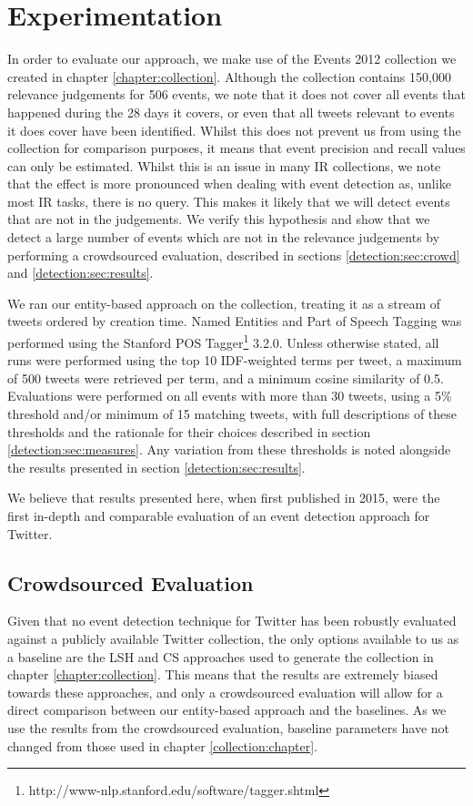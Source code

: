 
\section{Experimentation}
\label{detection:sec:experimentation}
In order to evaluate our approach, we make use of the Events 2012 collection we created in chapter \ref{chapter:collection}.
Although the collection contains 150,000 relevance judgements for 506 events, we note that it does not cover all events that happened during the 28 days it covers, or even that all tweets relevant to events it does cover have been identified.
Whilst this does not prevent us from using the collection for comparison purposes, it means that event precision and recall values can only be estimated.
Whilst this is an issue in many IR collections, we note that the effect is more pronounced when dealing with event detection as, unlike most IR tasks, there is no query.
This makes it likely that we will detect events that are not in the judgements.
We verify this hypothesis and show that we detect a large number of events which are not in the relevance judgements by performing a crowdsourced evaluation, described in sections \ref{detection:sec:crowd} and \ref{detection:sec:results}.

We ran our entity-based approach on the collection, treating it as a stream of tweets ordered by creation time. Named Entities and Part of Speech Tagging was performed using the Stanford POS Tagger\footnote{http://www-nlp.stanford.edu/software/tagger.shtml} 3.2.0.
Unless otherwise stated, all runs were performed using the top 10 IDF-weighted terms per tweet, a maximum of 500 tweets were retrieved per term, and a minimum cosine similarity of 0.5.
Evaluations were performed on all events with more than 30 tweets, using a 5\% threshold and/or minimum of 15 matching tweets, with full descriptions of these thresholds and the rationale for their choices described in section \ref{detection:sec:measures}.
Any variation from these thresholds is noted alongside the results presented in section \ref{detection:sec:results}.

We believe that results presented here, when first published in 2015, were the first in-depth and comparable evaluation of an event detection approach for Twitter.

\subsection{Crowdsourced Evaluation}
\label{sec:baseline}
Given that no event detection technique for Twitter has been robustly evaluated against a publicly available Twitter collection, the only options available to us as a baseline are the LSH \citep{Petrovic10} and CS \citep{Aggarwal12} approaches used to generate the collection in chapter \ref{chapter:collection}.
This means that the results are extremely biased towards these approaches, and only a crowdsourced evaluation will allow for a direct comparison between our entity-based approach and the baselines.
As we use the results from the crowdsourced evaluation, baseline parameters have not changed from those used in chapter \ref{collection:chapter}.

